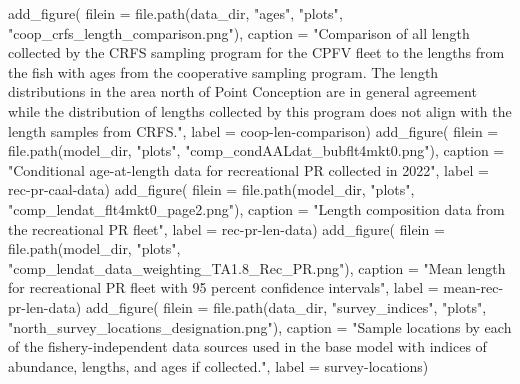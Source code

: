 \documentclass[
  letterpaper,
]{article}
\newenvironment{Shaded}{\begin{snugshade}}{\end{snugshade}}
\newcommand{\AttributeTok}[1]{\textcolor[rgb]{0.77,0.63,0.00}{#1}}
\newcommand{\FunctionTok}[1]{\textcolor[rgb]{0.00,0.00,0.00}{#1}}
\newcommand{\NormalTok}[1]{#1}
\newcommand{\StringTok}[1]{\textcolor[rgb]{0.31,0.60,0.02}{#1}}
\begin{document}
\begin{Shaded}
\begin{Highlighting}[]
\FunctionTok{add\_figure}\NormalTok{(}
\AttributeTok{filein =} \FunctionTok{file.path}\NormalTok{(data\_dir, }\StringTok{"ages"}\NormalTok{, }\StringTok{"plots"}\NormalTok{, }\StringTok{"coop\_crfs\_length\_comparison.png"}\NormalTok{), }
\AttributeTok{caption =} \StringTok{"Comparison of all length collected by the CRFS sampling program for the CPFV fleet to the lengths from the fish with ages from the cooperative sampling program. The length distributions in the area north of Point Conception are in general agreement while the distribution of lengths collected by this program does not align with the length samples from CRFS."}\NormalTok{,}
\AttributeTok{label =} \StringTok{\textquotesingle{}coop{-}len{-}comparison\textquotesingle{}}\NormalTok{)}
\FunctionTok{add\_figure}\NormalTok{(}
\AttributeTok{filein =} \FunctionTok{file.path}\NormalTok{(model\_dir, }\StringTok{"plots"}\NormalTok{, }\StringTok{"comp\_condAALdat\_bubflt4mkt0.png"}\NormalTok{), }
\AttributeTok{caption =} \StringTok{"Conditional age{-}at{-}length data for recreational PR collected in 2022"}\NormalTok{,}
\AttributeTok{label =} \StringTok{\textquotesingle{}rec{-}pr{-}caal{-}data\textquotesingle{}}\NormalTok{)}
\FunctionTok{add\_figure}\NormalTok{(}
\AttributeTok{filein =} \FunctionTok{file.path}\NormalTok{(model\_dir, }\StringTok{"plots"}\NormalTok{, }\StringTok{"comp\_lendat\_flt4mkt0\_page2.png"}\NormalTok{), }
\AttributeTok{caption =} \StringTok{"Length composition data from the recreational PR fleet"}\NormalTok{,}
\AttributeTok{label =} \StringTok{\textquotesingle{}rec{-}pr{-}len{-}data\textquotesingle{}}\NormalTok{)}
\FunctionTok{add\_figure}\NormalTok{(}
\AttributeTok{filein =} \FunctionTok{file.path}\NormalTok{(model\_dir, }\StringTok{"plots"}\NormalTok{, }\StringTok{"comp\_lendat\_data\_weighting\_TA1.8\_Rec\_PR.png"}\NormalTok{), }
\AttributeTok{caption =} \StringTok{"Mean length for recreational PR fleet with 95 percent confidence intervals"}\NormalTok{,}
\AttributeTok{label =} \StringTok{\textquotesingle{}mean{-}rec{-}pr{-}len{-}data\textquotesingle{}}\NormalTok{)}
\FunctionTok{add\_figure}\NormalTok{(}
\AttributeTok{filein =} \FunctionTok{file.path}\NormalTok{(data\_dir, }\StringTok{"survey\_indices"}\NormalTok{, }\StringTok{"plots"}\NormalTok{, }\StringTok{"north\_survey\_locations\_designation.png"}\NormalTok{), }
\AttributeTok{caption =} \StringTok{"Sample locations by each of the fishery{-}independent data sources used in the base model with indices of abundance, lengths, and ages if collected."}\NormalTok{,}
\AttributeTok{label =} \StringTok{\textquotesingle{}survey{-}locations\textquotesingle{}}\NormalTok{)}

\end{Highlighting}
\end{Shaded}
\end{document}
